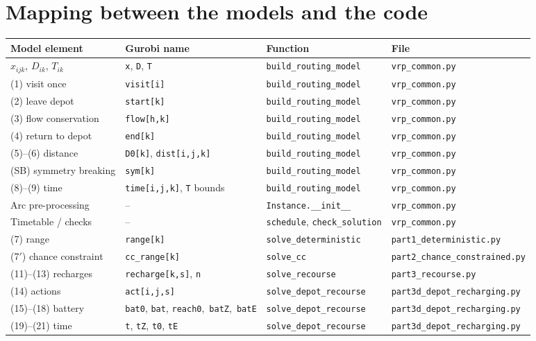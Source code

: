\documentclass[11pt,a4paper]{article}
\theoremstyle{definition}
\begin{document}
\section{Mapping between the models and the code}
\begin{table}[H]
\centering\footnotesize
\renewcommand{\arraystretch}{1.12}\setlength{\tabcolsep}{3.5pt}\scriptsize
\begin{tabular}{@{}l l l l@{}}
\toprule
Model element & Gurobi name & Function & File\\
\midrule
$x_{ijk}$, $D_{ik}$, $T_{ik}$ & \texttt{x}, \texttt{D}, \texttt{T} & \texttt{build\_routing\_model} & \texttt{vrp\_common.py}\\
(1) visit once & \texttt{visit[i]} & \texttt{build\_routing\_model} & \texttt{vrp\_common.py}\\
(2) leave depot & \texttt{start[k]} & \texttt{build\_routing\_model} & \texttt{vrp\_common.py}\\
(3) flow conservation & \texttt{flow[h,k]} & \texttt{build\_routing\_model} & \texttt{vrp\_common.py}\\
(4) return to depot & \texttt{end[k]} & \texttt{build\_routing\_model} & \texttt{vrp\_common.py}\\
(5)--(6) distance & \texttt{D0[k]}, \texttt{dist[i,j,k]} & \texttt{build\_routing\_model} & \texttt{vrp\_common.py}\\
(SB) symmetry breaking & \texttt{sym[k]} & \texttt{build\_routing\_model} & \texttt{vrp\_common.py}\\
(8)--(9) time & \texttt{time[i,j,k]}, \texttt{T} bounds & \texttt{build\_routing\_model} & \texttt{vrp\_common.py}\\
Arc pre-processing & -- & \texttt{Instance.\_\_init\_\_} & \texttt{vrp\_common.py}\\
Timetable / checks & -- & \texttt{schedule}, \texttt{check\_solution} & \texttt{vrp\_common.py}\\
\midrule
(7) range & \texttt{range[k]} & \texttt{solve\_deterministic} & \texttt{part1\_deterministic.py}\\
(7$'$) chance constraint & \texttt{cc\_range[k]} & \texttt{solve\_cc} & \texttt{part2\_chance\_constrained.py}\\
(11)--(13) recharges & \texttt{recharge[k,s]}, \texttt{n} & \texttt{solve\_recourse} & \texttt{part3\_recourse.py}\\
\midrule
(14) actions & \texttt{act[i,j,s]} & \texttt{solve\_depot\_recourse} & \texttt{part3d\_depot\_recharging.py}\\
(15)--(18) battery & \texttt{bat0}, \texttt{bat}, \texttt{reach0},\ \texttt{batZ},\ \texttt{batE} & \texttt{solve\_depot\_recourse} & \texttt{part3d\_depot\_recharging.py}\\
(19)--(21) time & \texttt{t}, \texttt{tZ}, \texttt{t0}, \texttt{tE} & \texttt{solve\_depot\_recourse} & \texttt{part3d\_depot\_recharging.py}\\
\bottomrule
\end{tabular}
\end{table}
\end{document}
